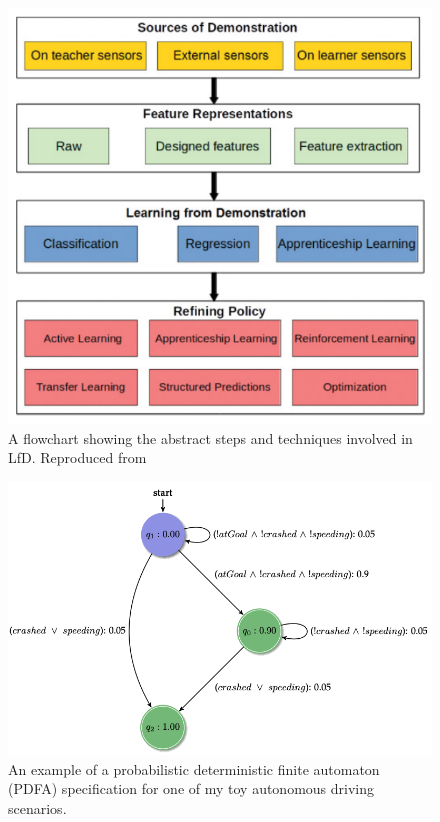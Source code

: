 \begin{figure}[htbp]
\centerline{\includegraphics[width=\linewidth]{Figures/lfd_flowchart.png}}
\caption{A flowchart showing the abstract steps and techniques involved in LfD. Reproduced from \cite{Hussein2017}}
\label{fig: lfd_flow}
\end{figure}

\begin{figure}[htbp]
\centerline{\includegraphics[width=\linewidth]{Figures/PDFA.png}}
\caption{An example of a probabilistic deterministic finite automaton (PDFA) specification for one of my toy autonomous driving scenarios.}
\label{fig: driving_pdfa_spec}
\end{figure}


